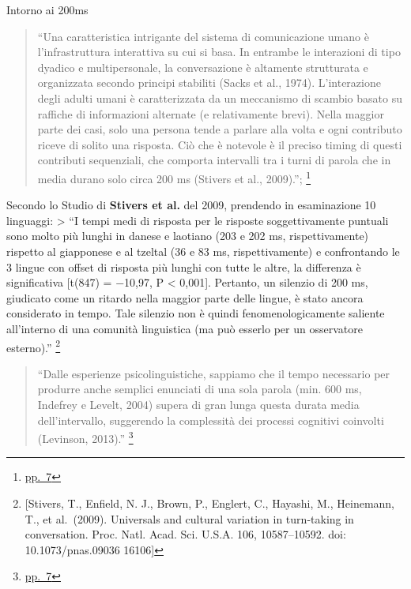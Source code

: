 \documentclass[
]{article}
\begin{document}
Intorno ai 200ms

\begin{quote}
``Una caratteristica intrigante del sistema di comunicazione umano è l'infrastruttura interattiva su cui si basa. In entrambe le interazioni di tipo dyadico e multipersonale, la conversazione è altamente strutturata e organizzata secondo principi stabiliti (Sacks et al., 1974). L'interazione degli adulti umani è caratterizzata da un meccanismo di scambio basato su raffiche di informazioni alternate (e relativamente brevi). Nella maggior parte dei casi, solo una persona tende a parlare alla volta e ogni contributo riceve di solito una risposta. Ciò che è notevole è il preciso timing di questi contributi sequenziali, che comporta intervalli tra i turni di parola che in media durano solo circa 200 ms (Stivers et al., 2009).''; \footnote{\href{DOC/608110.pdf}{pp.~7}}
\end{quote}

Secondo lo Studio di \textbf{Stivers et al.} del 2009, prendendo in esaminazione 10 linguaggi: \textgreater{} ``I tempi medi di risposta per le risposte soggettivamente puntuali sono molto più lunghi in danese e laotiano (203 e 202 ms, rispettivamente) rispetto al giapponese e al tzeltal (36 e 83 ms, rispettivamente) e confrontando le 3 lingue con offset di risposta più lunghi con tutte le altre, la differenza è significativa {[}t(847) = −10,97, P \textless{} 0,001{]}. Pertanto, un silenzio di 200 ms, giudicato come un ritardo nella maggior parte delle lingue, è stato ancora considerato in tempo. Tale silenzio non è quindi fenomenologicamente saliente all'interno di una comunità linguistica (ma può esserlo per un osservatore esterno).'' \footnote{{[}Stivers, T., Enfield, N. J., Brown, P., Englert, C., Hayashi, M., Heinemann, T., et al.~(2009). Universals and cultural variation in turn-taking in conversation. Proc. Natl. Acad. Sci. U.S.A. 106, 10587--10592. doi: 10.1073/pnas.09036 16106{]}}

\begin{quote}
``Dalle esperienze psicolinguistiche, sappiamo che il tempo necessario per produrre anche semplici enunciati di una sola parola (min. 600 ms, Indefrey e Levelt, 2004) supera di gran lunga questa durata media dell'intervallo, suggerendo la complessità dei processi cognitivi coinvolti (Levinson, 2013).'' \footnote{\href{DOC/608110.pdf}{pp.~7}}
\end{quote}
\end{document}
